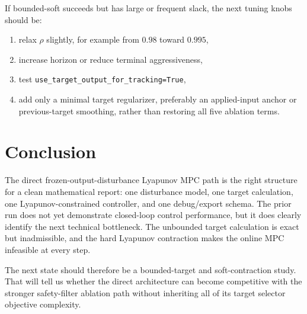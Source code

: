 \documentclass[11pt]{article}
\begin{document}
If bounded-soft succeeds but has large or frequent slack, the next tuning knobs
should be:
\begin{enumerate}[leftmargin=1.5em]
\item relax \(\rho\) slightly, for example from \(0.98\) toward \(0.995\),
\item increase horizon or reduce terminal aggressiveness,
\item test \texttt{use\_target\_output\_for\_tracking=True},
\item add only a minimal target regularizer, preferably an applied-input anchor
or previous-target smoothing, rather than restoring all five ablation terms.
\end{enumerate}

\section{Conclusion}

The direct frozen-output-disturbance Lyapunov MPC path is the right structure
for a clean mathematical report: one disturbance model, one target calculation,
one Lyapunov-constrained controller, and one debug/export schema. The prior run
does not yet demonstrate closed-loop control performance, but it does clearly
identify the next technical bottleneck. The unbounded target calculation is
exact but inadmissible, and the hard Lyapunov contraction makes the online MPC
infeasible at every step.

The next state should therefore be a bounded-target and soft-contraction study.
That will tell us whether the direct architecture can become competitive with
the stronger safety-filter ablation path without inheriting all of its target
selector objective complexity.
\end{document}
